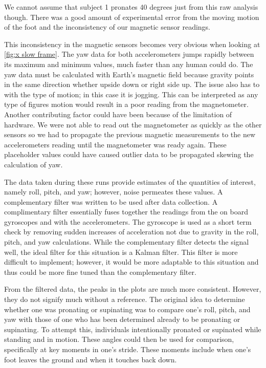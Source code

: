 We cannot assume that subject 1 pronates 40 degrees just from this raw analysis though.
There was a good amount of experimental error from the moving motion of the foot and the inconsistency of our magnetic sensor readings.\par
This inconsistency in the magnetic sensors becomes very obvious when looking at \ref{fig:x slow frame}.
The yaw data for both accelerometers jumps rapidly between its maximum and minimum values, much faster than any human could do.
The yaw data must be calculated with Earth's magnetic field because gravity points in the same direction whether upside down or right side up.
The issue also has to with the type of motion; in this case it is jogging.
This can be interpreted as any type of figures motion would result in a poor reading from the magnetometer.
Another contributing factor could have been because of the limitation of hardware.
We were not able to read out the magnetometer as quickly as the other sensors so we had to propagate the previous magnetic measurements to the new accelerometers reading until the magnetometer was ready again.
These placeholder values could have caused outlier data to be propagated skewing the calculation of yaw.\par
The data taken during these runs provide estimates of the quantities of interest, namely roll, pitch, and yaw; however, noise permeates these values.
A complementary filter was written to be used after data collection.
A complimentary filter essentially fuses together the readings from the on board gyroscopes and with the accelerometers.
The gyroscope is used as a short term check by removing sudden increases of acceleration not due to gravity in the roll, pitch, and yaw calculations.
While the complementary filter detects the signal well, the ideal filter for this situation is a Kalman filter.
This filter is more difficult to implement; however, it would be more adaptable to this situation and thus could be more fine tuned than the complementary filter.\par
From the filtered data, the peaks in the plots are much more consistent.
However, they do not signify much without a reference.
The original idea to determine whether one was pronating or supinating was to compare one’s roll, pitch, and yaw with those of one who has been determined already to be pronating or supinating.
To attempt this, individuals intentionally pronated or supinated while standing and in motion.
These angles could then be used for comparison, specifically at key moments in one’s stride.
These moments include when one’s foot leaves the ground and when it touches back down.\par
